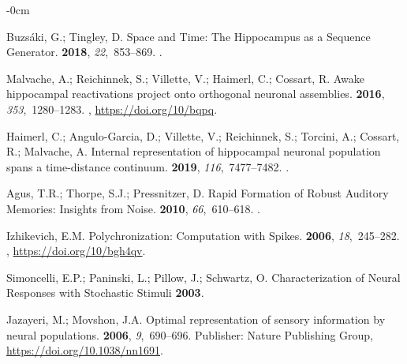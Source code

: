 \documentclass[brainsci, %
               review,submit,pdftex,moreauthors
               ]{Definitions/mdpi}
\begin{document}
\begin{adjustwidth}{-\extralength}{0cm}
\begin{thebibliography}{999}
  Buzsáki, G.; Tingley, D.
  \newblock Space and {Time}: {The} {Hippocampus} as a {Sequence} {Generator}.
   {\bf 2018}, {\em 22},~853--869.
  .
  
  Malvache, A.; Reichinnek, S.; Villette, V.; Haimerl, C.; Cossart, R.
  \newblock Awake hippocampal reactivations project onto orthogonal neuronal
    assemblies.
   {\bf 2016}, {\em 353},~1280--1283.
  , {\url{https://doi.org/10/bqpq}}.
  
  Haimerl, C.; Angulo-Garcia, D.; Villette, V.; Reichinnek, S.; Torcini, A.;
    Cossart, R.; Malvache, A.
  \newblock Internal representation of hippocampal neuronal population spans a
    time-distance continuum.
   {\bf 2019},
    {\em 116},~7477--7482.
  .
  
  Agus, T.R.; Thorpe, S.J.; Pressnitzer, D.
  \newblock Rapid {Formation} of {Robust} {Auditory} {Memories}: {Insights} from
    {Noise}.
   {\bf 2010}, {\em 66},~610--618.
  .
  
  Izhikevich, E.M.
  \newblock Polychronization: {Computation} with {Spikes}.
   {\bf 2006}, {\em 18},~245--282.
  , {\url{https://doi.org/10/bgh4qv}}.
  
  Simoncelli, E.P.; Paninski, L.; Pillow, J.; Schwartz, O.
  \newblock Characterization of {Neural} {Responses} with {Stochastic} {Stimuli}
    {\bf 2003}.
  
  Jazayeri, M.; Movshon, J.A.
  \newblock Optimal representation of sensory information by neural populations.
   {\bf 2006}, {\em 9},~690--696.
  \newblock Publisher: Nature Publishing Group,
    {\url{https://doi.org/10.1038/nn1691}}.
  

\end{thebibliography}
\end{adjustwidth}
\end{document}
